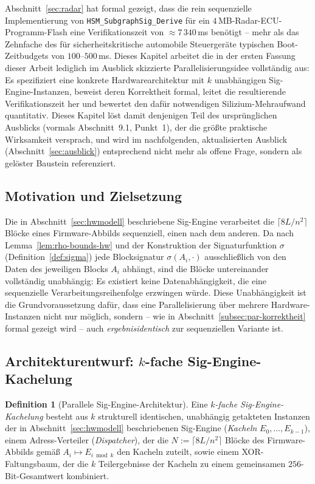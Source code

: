 ﻿\documentclass[a4paper,12pt]{article}
\theoremstyle{definition}
\newtheorem{definition}{Definition}
\begin{document}
Abschnitt~\ref{sec:radar} hat formal gezeigt, dass die rein sequenzielle Implementierung von \texttt{HSM\_SubgraphSig\_Derive} für ein $4$\,MB-Radar-ECU-Programm-Flash eine Verifikationszeit von $\approx 7\,340$\,ms benötigt -- mehr als das Zehnfache des für sicherheitskritische automobile Steuergeräte typischen Boot-Zeitbudgets von $100$--$500$\,ms. Dieses Kapitel arbeitet die in der ersten Fassung dieser Arbeit lediglich im Ausblick skizzierte Parallelisierungsidee vollständig aus: Es spezifiziert eine konkrete Hardwarearchitektur mit $k$ unabhängigen Sig-Engine-Instanzen, beweist deren Korrektheit formal, leitet die resultierende Verifikationszeit her und bewertet den dafür notwendigen Silizium-Mehraufwand quantitativ. Dieses Kapitel löst damit denjenigen Teil des ursprünglichen Ausblicks (vormals Abschnitt~9.1, Punkt~1), der die größte praktische Wirksamkeit versprach, und wird im nachfolgenden, aktualisierten Ausblick (Abschnitt~\ref{sec:ausblick}) entsprechend nicht mehr als offene Frage, sondern als gelöster Baustein referenziert.

\subsection{Motivation und Zielsetzung}

Die in Abschnitt~\ref{sec:hwmodell} beschriebene Sig-Engine verarbeitet die $\lceil 8L/n^2\rceil$ Blöcke eines Firmware-Abbilds sequenziell, einen nach dem anderen. Da nach Lemma~\ref{lem:rho-bounds-hw} und der Konstruktion der Signaturfunktion $\sigma$ (Definition~\ref{def:sigma}) jede Blocksignatur $\sigma(A_i, \cdot)$ ausschließlich von den Daten des jeweiligen Blocks $A_i$ abhängt, sind die Blöcke untereinander vollständig unabhängig: Es existiert keine Datenabhängigkeit, die eine sequenzielle Verarbeitungsreihenfolge erzwingen würde. Diese Unabhängigkeit ist die Grundvoraussetzung dafür, dass eine Parallelisierung über mehrere Hardware-Instanzen nicht nur möglich, sondern -- wie in Abschnitt~\ref{subsec:par-korrektheit} formal gezeigt wird -- auch \emph{ergebnisidentisch} zur sequenziellen Variante ist.

\subsection{Architekturentwurf: $k$-fache Sig-Engine-Kachelung}
\label{subsec:par-architektur}

\begin{definition}[Parallele Sig-Engine-Architektur]
	\label{def:par-arch}
	Eine \emph{$k$-fache Sig-Engine-Kachelung} besteht aus $k$ strukturell identischen, unabhängig getakteten Instanzen der in Abschnitt~\ref{sec:hwmodell} beschriebenen Sig-Engine (\emph{Kacheln} $E_0,\ldots,E_{k-1}$), einem Adress-Verteiler (\emph{Dispatcher}), der die $N := \lceil 8L/n^2\rceil$ Blöcke des Firmware-Abbilds gemäß $A_i \mapsto E_{i \bmod k}$ den Kacheln zuteilt, sowie einem XOR-Faltungsbaum, der die $k$ Teilergebnisse der Kacheln zu einem gemeinsamen $256$-Bit-Gesamtwert kombiniert.
\end{definition}
\end{document}
